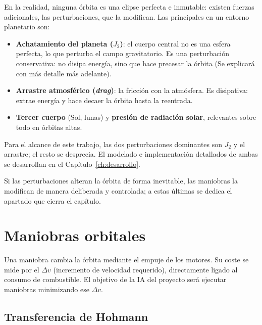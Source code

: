 En la realidad, ninguna órbita es una elipse perfecta e inmutable: existen fuerzas adicionales, las perturbaciones, que la modifican. Las principales en un entorno planetario son:

\begin{itemize}
  \item \textbf{Achatamiento del planeta ($J_2$)}: el cuerpo central no es una esfera perfecta, lo que perturba el campo gravitatorio. Es una perturbación conservativa: no disipa energía, sino que hace precesar la órbita (Se explicará con más detalle más adelante).
  \item \textbf{Arrastre atmosférico (\textit{drag})}: la fricción con la atmósfera. Es disipativa: extrae energía y hace decaer la órbita hasta la reentrada.
  \item \textbf{Tercer cuerpo} (Sol, lunas) y \textbf{presión de radiación solar}, relevantes sobre todo en órbitas altas.
\end{itemize}

Para el alcance de este trabajo, las dos perturbaciones dominantes son $J_2$ y el arrastre; el resto se desprecia. El modelado e  implementación detallados de ambas se desarrollan en el  Capítulo~\ref{ch:desarrollo}.

Si las perturbaciones alteran la órbita de forma inevitable, las maniobras la modifican de manera deliberada y controlada; a estas últimas se dedica el apartado que cierra el capítulo.

\section{Maniobras orbitales}
\label{sec:maniobras}

Una maniobra cambia la órbita mediante el empuje de los motores. Su coste se mide por el $\Delta v$ (incremento de velocidad requerido), directamente ligado al consumo de combustible. El objetivo de la \gls{IA} del proyecto será ejecutar maniobras minimizando ese $\Delta v$.

\subsection{Transferencia de Hohmann}
\label{sec:hohmann}

